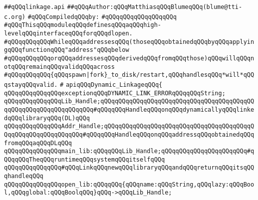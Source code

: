 \label{src/lib/c-glue-lib/ram/linkage.api}
\verb|##qQQqlinkage.api|\newline
\verb|##qQQqAuthor:qQQqMatthiasqQQqBlumeqQQq(blume@tti-c.org)|\newline
\newline
\verb|#qQQqCompiledqQQqby:|\newline
\verb|#qQQqqQQqqQQqqQQqqQQq|\newline
\newline
\newline
\newline
\verb|#qQQqThisqQQqmoduleqQQqdefinesqQQqaqQQqhigh-levelqQQqinterfaceqQQqforqQQqdlopen.|\newline
\verb|#qQQqqQQqqQQqWhileqQQqaddressesqQQq(thoseqQQqobtainedqQQqbyqQQqapplyingqQQqfunctionqQQq"address"qQQqbelow|\newline
\verb|#qQQqqQQqqQQqorqQQqaddressesqQQqderivedqQQqfromqQQqthose)qQQqwillqQQqnotqQQqremainqQQqvalidqQQqacross|\newline
\verb|#qQQqqQQqqQQq{qQQqspawn|\verb#|fork}_to_disk/restart,qQQqhandlesqQQq*will*qQQqstayqQQqvalid.#\newline
\verb|#|\newline
\newline
\verb|apiqQQqDynamic_LinkageqQQq{|\newline
\newline
\verb|qQQqqQQqqQQqqQQqexceptionqQQqDYNAMIC_LINK_ERRORqQQqqQQqString;|\newline
\newline
\verb|qQQqqQQqqQQqqQQqLib_Handle;qQQqqQQqqQQqqQQqqQQqqQQqqQQqqQQqqQQqqQQqqQQqqQQqqQQqqQQqqQQqqQQqqQQq#qQQqqQQqHandleqQQqonqQQqdynamicallyqQQqlinkedqQQqlibraryqQQq(DL)qQQq|\newline
\verb|qQQqqQQqqQQqqQQqAddr_Handle;qQQqqQQqqQQqqQQqqQQqqQQqqQQqqQQqqQQqqQQqqQQqqQQqqQQqqQQqqQQqqQQq#qQQqqQQqHandleqQQqonqQQqaddressqQQqobtainedqQQqfromqQQqaqQQqDLqQQq|\newline
\newline
\verb|qQQqqQQqqQQqqQQqmain_lib:qQQqqQQqLib_Handle;qQQqqQQqqQQqqQQqqQQqqQQq#qQQqqQQqTheqQQqruntimeqQQqsystemqQQqitselfqQQq|\newline
\newline
\verb|qQQqqQQqqQQqqQQq#qQQqLinkqQQqnewqQQqlibraryqQQqandqQQqreturnqQQqitsqQQqhandleqQQq|\newline
\verb|qQQqqQQqqQQqqQQqopen_lib:qQQqqQQq{qQQqname:qQQqString,qQQqlazy:qQQqBool,qQQqglobal:qQQqBoolqQQq}qQQq->qQQqLib_Handle;|\newline
